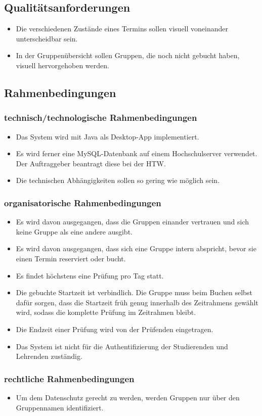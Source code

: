 \subsection{Qualitätsanforderungen}
\begin{itemize}
  \item Die verschiedenen Zustände eines Termins sollen visuell voneinander unterscheidbar sein.
  \item In der Gruppenübersicht sollen Gruppen, die noch nicht gebucht haben, visuell hervorgehoben werden.
\end{itemize}

\subsection{Rahmenbedingungen}
\subsubsection{technisch/technologische Rahmenbedingungen}
\begin{itemize}
  \item Das System wird mit Java als Desktop-App implementiert.
  \item Es wird ferner eine MySQL-Datenbank auf einem Hochschulserver verwendet. Der Auftraggeber beantragt diese bei der HTW.
  \item Die technischen Abhängigkeiten sollen so gering wie möglich sein.
\end{itemize}

\subsubsection{organisatorische Rahmenbedingungen}
\begin{itemize}
  \item Es wird davon ausgegangen, dass die Gruppen einander vertrauen und sich keine Gruppe als eine andere ausgibt.
  \item Es wird davon ausgegangen, dass sich eine Gruppe intern abspricht, bevor sie einen Termin reserviert oder bucht.
  \item Es findet höchstens eine Prüfung pro Tag statt.
  \item Die gebuchte Startzeit ist verbindlich. Die Gruppe muss beim Buchen selbst dafür sorgen, dass die Startzeit früh genug innerhalb des Zeitrahmens gewählt wird, sodass die komplette Prüfung im Zeitrahmen bleibt.
  \item Die Endzeit einer Prüfung wird von der Prüfenden eingetragen.
  \item Das System ist nicht für die Authentifizierung der Studierenden und Lehrenden zuständig.
\end{itemize}

\subsubsection{rechtliche Rahmenbedingungen}
\begin{itemize}
  \item Um dem Datenschutz gerecht zu werden, werden Gruppen nur über den Gruppennamen identifiziert.
\end{itemize}
